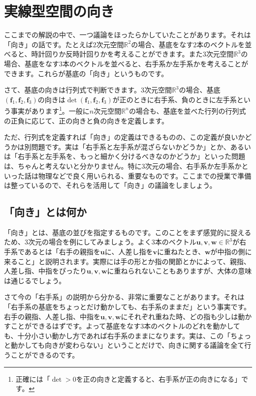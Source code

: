 \section{実線型空間の向き}

ここまでの解説の中で、一つ議論をほったらかしていたことがあります。それは「向き」の話です。たとえば$2$次元空間$\mathbb{R}^2$の場合、基底をなす$2$本のベクトルを並べると、時計回りか反時計回りかを考えることができます。また$3$次元空間$\mathbb{R}^3$の場合、基底をなす$3$本のベクトルを並べると、右手系か左手系かを考えることができます。これらが基底の「向き」というものです。

さて、基底の向きは行列式で判断できます。$3$次元空間$\mathbb{R}^3$の場合、基底$(\bm{f}_1, \bm{f}_2, \bm{f}_3)$の向きは$\det(\bm{f}_1, \bm{f}_2, \bm{f}_3)$が正のときに右手系、負のときに左手系という事実があります\footnote{正確には「$\det > 0$を正の向きと定義すると、右手系が正の向きになる」です。}。一般に$n$次元空間$\mathbb{R}^n$の場合も、基底を並べた行列の行列式の正負に応じて、正の向きと負の向きを定義します。

ただ、行列式を定義すれば「向き」の定義はできるものの、この定義が良いかどうかは別問題です。実は「右手系と左手系が混ざらないかどうか」とか、あるいは「右手系と左手系を、もっと細かく分けるべきなのかどうか」といった問題は、ちゃんと考えないと分かりません。特に$3$次元の場合、右手系か左手系かといった話は物理などで良く用いられる、重要なものです。ここまでの授業で準備は整っているので、それらを活用して「向き」の議論をしましょう。

\subsection{「向き」とは何か}

「向き」とは、基底の並びを指定するものです。このことをまず感覚的に捉えるため、$3$次元の場合を例にしてみましょう。よく$3$本のベクトル$\bm{u}, \bm{v}, \bm{w} \in \mathbb{R}^3$が右手系であるとは「右手の親指を$\bm{u}$に、人差し指を$\bm{v}$に重ねたとき、$\bm{w}$が中指の側に来ること」と説明されます。実際には手の形とか指の関節とかによって、親指、人差し指、中指をぴったり$\bm{u}, \bm{v}, \bm{w}$に重ねられないこともありますが、大体の意味は通じるでしょう。

さて今の「右手系」の説明から分かる、非常に重要なことがあります。それは「右手系の基底をちょっとだけ動かしても、右手系のままだ」という事実です。右手の親指、人差し指、中指を$\bm{u}, \bm{v}, \bm{w}$にそれぞれ重ねた時、どの指も少しは動かすことができるはずです。よって基底をなす$3$本のベクトルのどれを動かしても、十分小さい動かし方であれば右手系のままになります。実は、この「ちょっと動かしても向きが変わらない」ということだけで、向きに関する議論を全て行うことができるのです。

